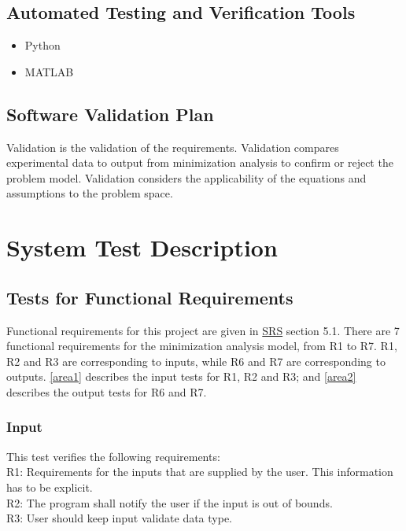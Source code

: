 \documentclass[12pt, titlepage]{article}
\begin{document}
\subsection{Automated Testing and Verification Tools}
\begin{itemize}
	\item Python 
\end{itemize}
\begin{itemize}
	\item MATLAB
\end{itemize}

\subsection{Software Validation Plan}

Validation is the validation of the requirements. Validation compares experimental data to output from minimization analysis to confirm or reject the problem model. Validation considers the applicability of the equations and assumptions to the problem space.


\section{System Test Description}
\label{systd}
	
\subsection{Tests for Functional Requirements}
\label{tfr}

Functional requirements for this project are given in 
\href{https://github.com/KarenKarenWang/cas741_project1/blob/main/docs/SRS/SRS.pdf}
{SRS} section 5.1. There are 7 functional requirements for the minimization analysis model, from R1 to R7.
R1, R2 and R3 are corresponding to inputs, while R6 and R7 are corresponding to outputs.
\autoref{area1} describes the input tests for R1, R2 and R3; and \autoref{area2} 
describes the output tests for R6 and R7.

\subsubsection{Input}\label{Ainput}
\label{area1}

This test verifies the following requirements: \\
\indent  R1: Requirements for the inputs that are supplied by the user. This information has to be
explicit.\\
\indent  R2: The program shall notify the user if the input is out of bounds.\\
\indent R3: User should keep input validate data type.\\		
\end{document}
